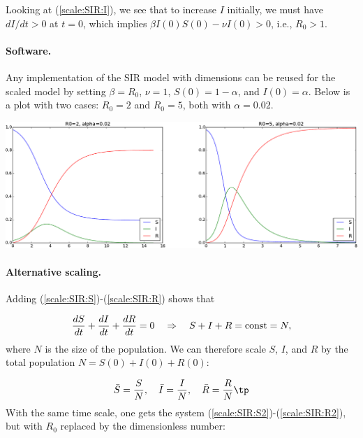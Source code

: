 \documentclass[graybox,envcountchap,sectrefs,final]{svmonodo}
\begin{document}
Looking at (\ref{scale:SIR:I}), we see that to increase $I$ initially,
we must have $dI/dt >0$ at $t=0$, which implies
$\beta I(0)S(0) - \nu I(0) >0$, i.e., $R_0 > 1$.

\paragraph{Software.}
Any implementation of the SIR model with dimensions can be reused for
the scaled model by setting $\beta = R_0$, $\nu = 1$, $S(0)=1-\alpha$,
and $I(0)=\alpha$. Below is a plot with two cases: $R_0=2$ and $R_0=5$,
both with $\alpha=0.02$.



\vspace{3mm}




\vspace{3mm}





\centerline{\includegraphics[width=1.0\linewidth]{fig-scaling/SIR1.pdf}}





\vspace{3mm}




\vspace{3mm}




\paragraph{Alternative scaling.}
Adding (\ref{scale:SIR:S})-(\ref{scale:SIR:R}) shows that

\[ \frac{dS}{dt}+\frac{dI}{dt}+\frac{dR}{dt}=0\quad\Rightarrow\quad
S+I+R=\hbox{const}=N,\]
where $N$ is the size of the population.
We can therefore scale $S$, $I$, and $R$ by the total
population $N=S(0)+I(0)+R(0)$:

\[ \bar S = \frac{S}{N},\quad \bar I = \frac{I}{N},\quad
\bar R = \frac{R}{N}\tp
\]
With the same time scale, one gets the system (\ref{scale:SIR:S2})-(\ref{scale:SIR:R2}), but with $R_0$ replaced by the dimensionless number:
\end{document}
